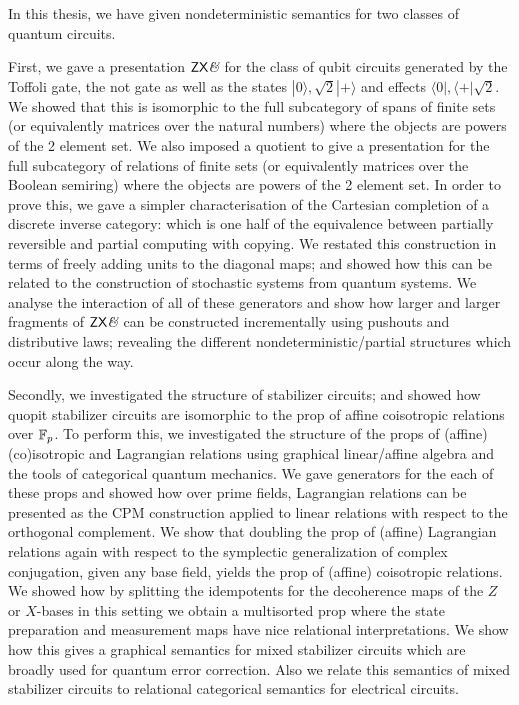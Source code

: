
In this thesis, we have given nondeterministic semantics for two classes of quantum circuits.  


First, we gave a presentation $\mathsf{ZX}\textit{\&}$ for the  class of qubit circuits generated by the Toffoli gate, the not gate as well as the states $|0\rangle, \sqrt 2 |+\rangle$ and effects $\langle 0 |, \langle +|\sqrt{2}$.  We showed that this is isomorphic to the full subcategory of spans of finite sets (or equivalently matrices over the natural numbers) where the objects are powers of the 2 element set.  We also imposed a quotient to give a presentation for the full subcategory of relations of finite sets (or equivalently matrices over the Boolean semiring) where the objects are powers of the 2 element set.  In order to prove this, we gave a simpler characterisation of the Cartesian completion of a discrete inverse category: which is one half of the equivalence between partially reversible and partial computing with copying.  We restated this construction in terms of freely adding units to the diagonal maps; and showed how this can be related to the construction of stochastic systems from quantum systems.  We analyse the interaction of all of these generators and show how larger and larger fragments of $\mathsf{ZX}\textit{\&}$ can be constructed incrementally using pushouts and distributive laws; revealing the different nondeterministic/partial structures which occur along the way.


Secondly, we investigated the structure of stabilizer circuits; and showed how quopit stabilizer circuits are isomorphic to the prop of affine coisotropic relations over $\mathbb{F}_p$.  To perform this, we investigated the structure of the props of (affine) (co)isotropic and Lagrangian relations using graphical linear/affine algebra and the tools of categorical quantum mechanics.  We gave generators for the each of these props and showed how over prime fields, Lagrangian relations can be presented as the CPM construction applied to linear relations with respect to the orthogonal complement.  We show that doubling the prop of (affine) Lagrangian relations again with respect to the symplectic generalization of complex conjugation, given any base field, yields the prop of (affine) coisotropic relations.  We showed how by splitting the idempotents for the decoherence maps of the $Z$ or $X$-bases in this setting we obtain a multisorted prop where the state preparation and measurement maps have nice relational interpretations.  We show how this gives a graphical semantics for mixed stabilizer circuits which are broadly used for quantum error correction.  Also we relate this semantics of mixed stabilizer circuits to relational categorical semantics for electrical circuits.

